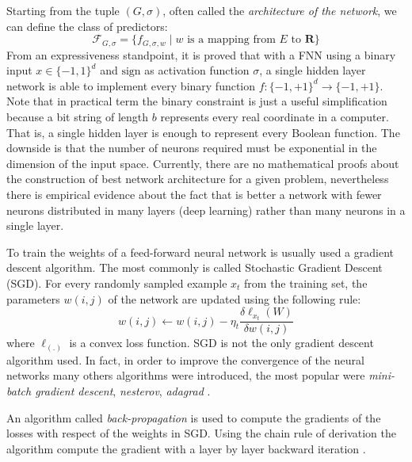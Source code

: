 Starting from the tuple $(G, \sigma)$, often called the \emph{architecture of the network}, we can define the class of predictors: 
\[ \mathcal{F}_{G, \sigma} = \{ f_{G, \sigma, w} \mid w \textrm{ is a mapping from } E \textrm{ to } \mathbf R \} \]
From an expressiveness standpoint, it is proved that with a FNN using a binary input $x \in \{-1, 1\}^d$ and $\mathrm{sign}$ as activation
function $\sigma$, a single hidden layer network is able to
implement every binary function $f: \{-1, +1\}^d \to \{-1, +1\}$. Note that in practical term the binary constraint is just a useful simplification because a bit string of length $b$ represents every real coordinate in a computer.  That is, a single hidden layer is
enough to represent every Boolean function. The downside is that
the number of neurons required must be exponential in the dimension
of the input space. Currently, there are no mathematical proofs about the construction of
best network architecture for a given problem, nevertheless there is empirical evidence
about the fact that is better a network with fewer neurons distributed in many layers (deep
learning) rather than many neurons in a single layer. %

To train the weights of a feed-forward neural network is usually
used a gradient descent algorithm. The most commonly is called
Stochastic Gradient Descent (SGD). For every randomly sampled
example $x_t$ from the training set, the parameters $w(i, j)$ of the
network are updated using the following rule:
\begin{equation} \label{eq:sgd} 
w(i, j) \leftarrow w(i, j) -  \eta_t \frac{\delta\ell_{x_t}(W)}{\delta w(i, j )}
\end{equation}
where $\ell_(.)$ is a convex loss function. SGD is not the only
gradient descent algorithm used. In fact, in order to
improve the convergence of the neural networks many others algorithms were introduced,
the most popular were \emph{mini-batch gradient descent}, \emph{nesterov}, \emph{adagrad}
\cite{RuderGDOpt}. 

An algorithm called \emph{back-propagation} is used to compute the
gradients of the losses with respect of the weights in SGD. Using the chain rule of derivation the algorithm compute the gradient with a layer by layer backward iteration
\cite{HintonBackProp}.
 


